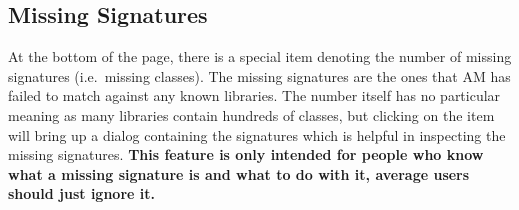 
\subsection{Missing Signatures}\label{subsec:missing-signatures} %
At the bottom of the page, there is a special item denoting the number of missing signatures (i.e.\ missing classes).
The missing signatures are the ones that AM has failed to match against any known libraries. The number itself has no
particular meaning as many libraries contain hundreds of classes, but clicking on the item will bring up a dialog
containing the signatures which is helpful in inspecting the missing signatures. \textbf{This feature is only intended
for people who know what a missing signature is and what to do with it, average users should just ignore it.}
